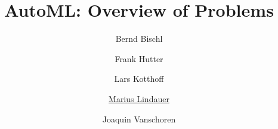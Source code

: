 




\title[AutoML: Problem]{AutoML: Overview of Problems}
\author[Marius Lindauer]{Bernd Bischl \and Frank Hutter \and Lars Kotthoff\newline \and \underline{Marius Lindauer} \and Joaquin Vanschoren}
\institute{}
\date{}





	
	\maketitle
	

